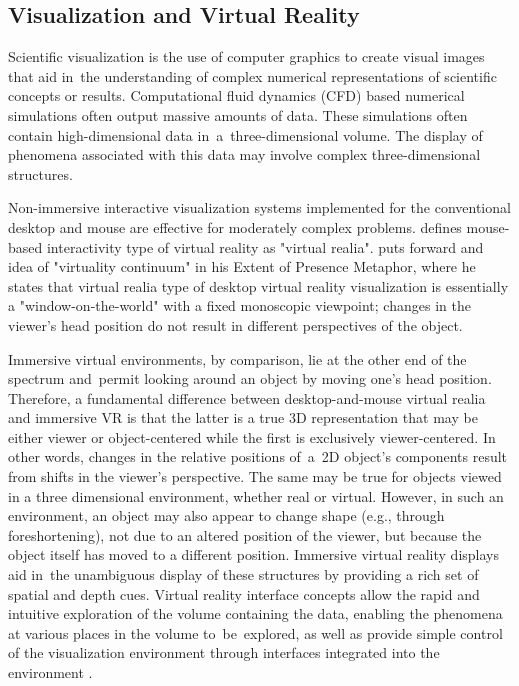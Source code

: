 \subsection{Visualization and Virtual Reality}
\label{subsection:2.4}

Scientific visualization is the use of computer graphics to create visual images that aid in~the understanding of complex numerical representations of scientific concepts or results. Computational fluid dynamics (CFD) based numerical simulations often output massive amounts of data. These simulations often contain high-dimensional data in~a~three-dimensional volume. The display of phenomena associated with this data may involve complex three-dimensional structures.

Non-immersive interactive visualization systems implemented for the conventional desktop and mouse are effective for moderately complex problems. \citet{Kealy2006} defines mouse-based interactivity type of virtual reality as "virtual realia". \citet{Milgram1994} puts forward and idea of "virtuality continuum" in his Extent of Presence Metaphor, where he states that virtual realia type of desktop virtual reality visualization is essentially a "window-on-the-world" with a fixed monoscopic viewpoint; changes in the viewer’s head position do not result in different perspectives of the object.

Immersive virtual environments, by comparison, lie at the other end of the spectrum and~permit looking around an object by moving one's head position. Therefore, a fundamental difference between desktop-and-mouse virtual realia and immersive VR is that the latter is a true 3D representation that may be either viewer or object-centered while the first is exclusively viewer-centered. In other words, changes in the relative positions of~a~2D object's components result from shifts in the viewer's perspective. The same may be true for objects viewed in a three dimensional environment, whether real or virtual. However, in such an environment, an object may also appear to change shape (e.g., through foreshortening), not due to an altered position of the viewer, but because the object itself has moved to a different position. Immersive virtual reality displays aid in~the unambiguous display of these structures by providing a rich set of spatial and depth cues. Virtual reality interface concepts allow the rapid and intuitive exploration of the volume containing the data, enabling the phenomena at various places in the volume to~be~explored, as well as provide simple control of the visualization environment through interfaces integrated into the environment \citep{Bryson1996}.


